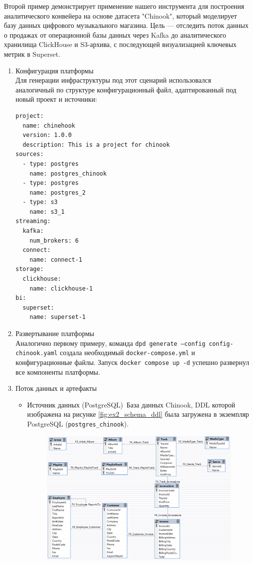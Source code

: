 Второй пример демонстрирует применение нашего инструмента для построения аналитического конвейера на основе датасета "Chinook"\cite{chinook}, который моделирует базу данных цифрового музыкального магазина. Цель — отследить поток данных о продажах от операционной базы данных через Kafka до аналитического хранилища ClickHouse и S3-архива, с последующей визуализацией ключевых метрик в Superset.

\begin{enumerate}[1.]
  \item Конфигурация платформы\\
        Для генерации инфраструктуры под этот сценарий использовался аналогичный по структуре конфигурационный файл, адаптированный под новый проект и источники:
        \begin{verbatim}
project:
  name: chinehook
  version: 1.0.0
  description: This is a project for chinook
sources:
  - type: postgres
    name: postgres_chinook
  - type: postgres
    name: postgres_2
  - type: s3
    name: s3_1
streaming:
  kafka:
    num_brokers: 6
  connect:
    name: connect-1
storage:
  clickhouse:
    name: clickhouse-1 
bi:
  superset:
    name: superset-1
    \end{verbatim}
  \item{Развертывание платформы}\\
        Аналогично первому примеру, команда \texttt{dpd generate --config config-chinook.yaml} создала необходимый \texttt{docker-compose.yml} и конфигурационные файлы. Запуск \texttt{docker compose up -d} успешно развернул все компоненты платформы.
  \item{Поток данных и артефакты}
        \begin{itemize}
          \item Источник данных (PostgreSQL)\
                База данных Chinook, DDL которой изображена на рисунке \ref{fig:ex2_schema_ddl} была загружена в экземпляр PostgreSQL (\texttt{postgres\_chinook}).
                \begin{figure}[h]
                  \center
                  \includegraphics [scale=0.5] {my_folder/images/ex2_schema_ddl}

\end{figure}
\end{itemize}
\end{enumerate}
